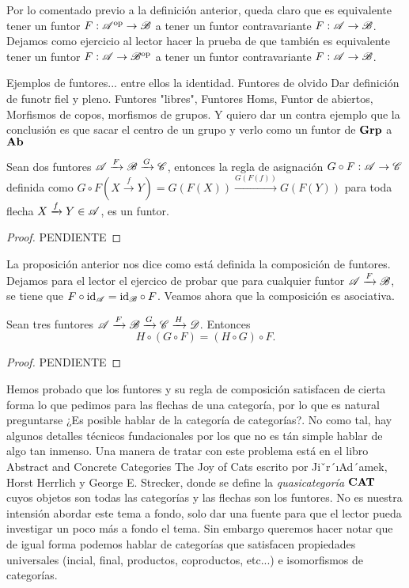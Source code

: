 \documentclass{comunicaciones}
\begin{document}
Por lo comentado previo a la definición anterior, queda claro que es equivalente tener un funtor $F:\mathscr A^{\mathrm{op}}\to\mathscr B$ a tener un funtor contravariante $F:\mathscr A\to\mathscr B$.
Dejamos como ejercicio al lector hacer la prueba de que también es equivalente tener un funtor $F:\mathscr A\to\mathscr B^{\mathrm{op}}$ a tener un funtor contravariante $F:\mathscr A\to\mathscr B$.

Ejemplos de funtores... entre ellos la identidad. Funtores de olvido Dar definición de funotr fiel y pleno. Funtores "libres", Funtores Homs, Funtor de abiertos, Morfismos de copos, morfismos de grupos. 
Y quiero dar un contra ejemplo que la conclusión es que sacar el centro de un grupo y verlo como un funtor de $\mathbf{Grp}$ a $\mathbf{Ab}$

\begin{prop}
    Sean dos funtores $\mathscr A\xrightarrow{F}\mathscr B\xrightarrow{G}\mathscr C$, entonces la regla de asignación $G\circ F:\mathscr A\to\mathscr C$ definida como 
    $G\circ F(X\xrightarrow{f}Y)=G(F(X))\xrightarrow{G(F(f))}G(F(Y))$ para toda flecha $X\xrightarrow{f}Y\in\mathscr A$, es un funtor.
\end{prop}
\begin{proof}
    PENDIENTE
\end{proof}

La proposición anterior nos dice como está definida la composición de funtores. Dejamos para el lector el ejercico de probar que para cualquier funtor $\mathscr A\xrightarrow{F}\mathscr B$, se tiene que $F\circ\mathrm{id}_\mathscr A=\mathrm{id}_\mathscr B\circ F$.
Veamos ahora que la composición es asociativa.

\begin{prop}
    Sean tres funtores $\mathscr A\xrightarrow{F}\mathscr B\xrightarrow{G}\mathscr C\xrightarrow{H}\mathscr D$. Entonces $$H\circ(G\circ F)=(H\circ G)\circ F.$$
\end{prop}
\begin{proof}
    PENDIENTE
\end{proof}

Hemos probado que los funtores y su regla de composición satisfacen de cierta forma lo que pedimos para las flechas de una categoría, por lo que es natural preguntarse
¿Es posible hablar de la categoría de categorías?. No como tal, hay algunos detalles técnicos fundacionales por los que no es tán simple hablar de algo tan inmenso. Una manera de
tratar con este problema está en el libro Abstract and Concrete Categories The Joy of Cats escrito por Jiˇr´ıAd´amek, Horst Herrlich y George E. Strecker, donde se define la 
\emph{quasicategoría} $\mathbf{CAT}$ cuyos objetos son todas las categorías y las flechas son los funtores. No es nuestra intensión abordar este tema a fondo, 
solo dar una fuente para que el lector pueda investigar un poco más a fondo el tema. Sin embargo queremos hacer notar que de igual forma podemos
hablar de categorías que satisfacen propiedades universales (incial, final, productos, coproductos, etc...) e isomorfismos de categorías.
\end{document}

